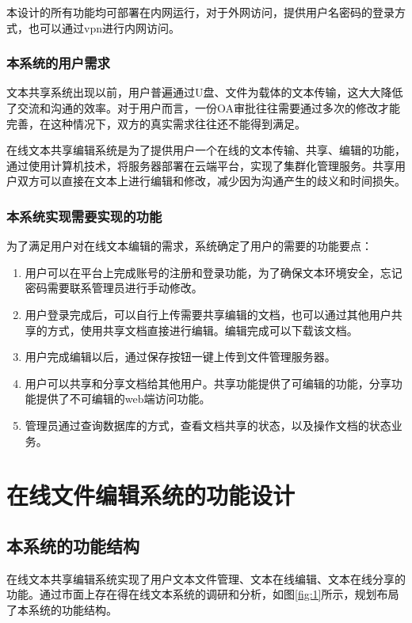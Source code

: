 \documentclass[forprint]{software}
\begin{document}
本设计的所有功能均可部署在内网运行，对于外网访问，提供用户名密码的登录方式，也可以通过vpn进行内网访问。

\subsection{本系统的用户需求}

文本共享系统出现以前，用户普遍通过U盘、文件为载体的文本传输，这大大降低了交流和沟通的效率。对于用户而言，一份OA审批往往需要通过多次的修改才能完善，在这种情况下，双方的真实需求往往还不能得到满足。

在线文本共享编辑系统是为了提供用户一个在线的文本传输、共享、编辑的功能，通过使用计算机技术，将服务器部署在云端平台，实现了集群化管理服务。共享用户双方可以直接在文本上进行编辑和修改，减少因为沟通产生的歧义和时间损失。

\subsection{本系统实现需要实现的功能}

为了满足用户对在线文本编辑的需求，系统确定了用户的需要的功能要点：\\

\begin{enumerate}
	\item 用户可以在平台上完成账号的注册和登录功能，为了确保文本环境安全，忘记密码需要联系管理员进行手动修改。
	\item 用户登录完成后，可以自行上传需要共享编辑的文档，也可以通过其他用户共享的方式，使用共享文档直接进行编辑。编辑完成可以下载该文档。
	\item 用户完成编辑以后，通过保存按钮一键上传到文件管理服务器。
	\item 用户可以共享和分享文档给其他用户。共享功能提供了可编辑的功能，分享功能提供了不可编辑的web端访问功能。
	\item 管理员通过查询数据库的方式，查看文档共享的状态，以及操作文档的状态业务。
\end{enumerate}

\chapter{在线文件编辑系统的功能设计}

\section{本系统的功能结构}

在线文本共享编辑系统实现了用户文本文件管理、文本在线编辑、文本在线分享的功能。通过市面上存在得在线文本系统的调研和分析，如图\ref{fig:1}所示，规划布局了本系统的功能结构。
\end{document}
